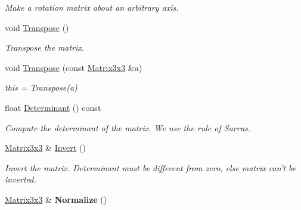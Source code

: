 \begin{DoxyCompactItemize}
\begin{DoxyCompactList}\small\item\em Make a rotation matrix about an arbitrary axis. \end{DoxyCompactList}\item 
\hypertarget{class_matrix3x3_a749e22af87eed9f1d646a2737792844d}{void \hyperlink{class_matrix3x3_a749e22af87eed9f1d646a2737792844d}{Transpose} ()}\label{class_matrix3x3_a749e22af87eed9f1d646a2737792844d}

\begin{DoxyCompactList}\small\item\em Transpose the matrix. \end{DoxyCompactList}\item 
\hypertarget{class_matrix3x3_a1102e3c3f8d5fa7436b7b448ee587339}{void \hyperlink{class_matrix3x3_a1102e3c3f8d5fa7436b7b448ee587339}{Transpose} (const \hyperlink{class_matrix3x3}{Matrix3x3} \&a)}\label{class_matrix3x3_a1102e3c3f8d5fa7436b7b448ee587339}

\begin{DoxyCompactList}\small\item\em this = Transpose(a) \end{DoxyCompactList}\item 
\hypertarget{class_matrix3x3_a37acc3f90610cd4afc0660be31297bd5}{float \hyperlink{class_matrix3x3_a37acc3f90610cd4afc0660be31297bd5}{Determinant} () const }\label{class_matrix3x3_a37acc3f90610cd4afc0660be31297bd5}

\begin{DoxyCompactList}\small\item\em Compute the determinant of the matrix. We use the rule of Sarrus. \end{DoxyCompactList}\item 
\hypertarget{class_matrix3x3_a09c69c6790de1d23159eef6cfaa67ade}{\hyperlink{class_matrix3x3}{Matrix3x3} \& \hyperlink{class_matrix3x3_a09c69c6790de1d23159eef6cfaa67ade}{Invert} ()}\label{class_matrix3x3_a09c69c6790de1d23159eef6cfaa67ade}

\begin{DoxyCompactList}\small\item\em Invert the matrix. Determinant must be different from zero, else matrix can't be inverted. \end{DoxyCompactList}\item 
\hypertarget{class_matrix3x3_a0f58e158b9b98d162c23eabe33f78acd}{\hyperlink{class_matrix3x3}{Matrix3x3} \& {\bfseries Normalize} ()}\label{class_matrix3x3_a0f58e158b9b98d162c23eabe33f78acd}


\end{DoxyCompactItemize}
